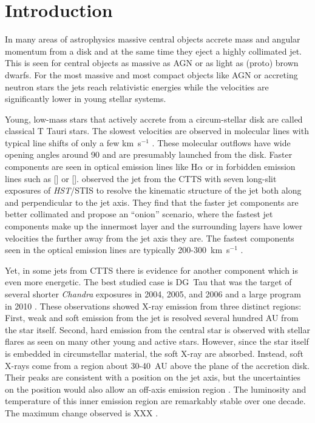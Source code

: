\section{Introduction} 
In many areas of astrophysics massive central objects accrete mass and angular momentum from a disk and at the same time they eject a highly collimated jet. This is seen for central objects as massive as AGN or as light as (proto) brown dwarfs. For the most massive and most compact objects like AGN or accreting neutron stars the jets reach relativistic energies while the velocities are significantly lower in young stellar systems. 

Young, low-mass stars that actively accrete from a circum-stellar disk are called classical T Tauri stars. The slowest velocities are observed in molecular lines with typical line shifts of only a few km~s$^{-1}$ \citep{2008ApJ...676..472B}. These molecular outflows have wide opening angles around 90\degree{} \citep[e.g.][]{2013A&A...557A.110S} and are presumably launched from the disk. Faster components are seen in optical emission lines like H$\alpha$ or in forbidden emission lines such as [] or []. \citet{2000ApJ...537L..49B} observed the jet from the CTTS  with seven long-slit exposures of \emph{HST}/STIS to resolve the kinematic structure of the jet both along and perpendicular to the jet axis. They find that the faster jet components are better collimated and propose an ``onion'' scenario, where the fastest jet components make up the innermost layer and the surrounding layers have lower velocities the further away from the jet axis they are. The fastest components seen in the optical emission lines are typically 200-300~km~s$^{-1}$ \citep{2004Ap&SS.292..651B,2008ApJ...689.1112C,2013A&A...550L...1S}.

Yet, in some jets from CTTS there is evidence for another component which is even more energetic. The best studied case is DG~Tau that was the target of several shorter \emph{Chandra} exposures in 2004, 2005, and 2006 and a large program in 2010 \citep{2005ApJ...626L..53G,2008A&A...478..797G,2011ASPC..448..617G}. These observations showed X-ray emission from three distinct regions: First, weak and soft emission from the jet is resolved several hundred AU from the star itself. Second, hard emission from the central star is observed with stellar flares as seen on many other young and active stars. However, since the star itself is embedded in circumstellar material, the soft X-ray are absorbed. Instead, soft X-rays come from a region about 30-40~AU above the plane of the accretion disk. Their peaks are consistent with a position on the jet axis, but the uncertainties on the position would also allow an off-axis emission region \citep{2008A&A...488L..13S}. The luminosity and temperature of this inner emission region are remarkably stable over one decade. The maximum change observed is XXX \citep{SchneiderDGTauXray}.

